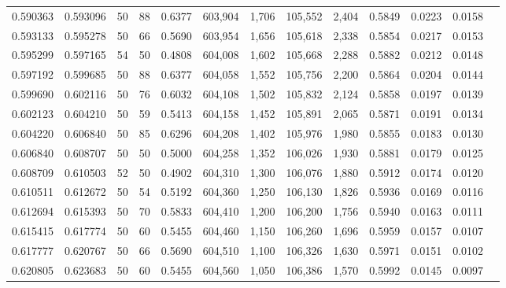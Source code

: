 \begin{tabular}{rrrrrrrrrrrrr}
0.590363 & 0.593096 &    50 &  88 &                                     0.6377 & 603,904 &   1,706 & 105,552 &   2,404 & 0.5849 & 0.0223 & 0.0158 \\
0.593133 & 0.595278 &    50 &  66 &                                     0.5690 & 603,954 &   1,656 & 105,618 &   2,338 & 0.5854 & 0.0217 & 0.0153 \\
0.595299 & 0.597165 &    54 &  50 &                                     0.4808 & 604,008 &   1,602 & 105,668 &   2,288 & 0.5882 & 0.0212 & 0.0148 \\
0.597192 & 0.599685 &    50 &  88 &                                     0.6377 & 604,058 &   1,552 & 105,756 &   2,200 & 0.5864 & 0.0204 & 0.0144 \\
0.599690 & 0.602116 &    50 &  76 &                                     0.6032 & 604,108 &   1,502 & 105,832 &   2,124 & 0.5858 & 0.0197 & 0.0139 \\
0.602123 & 0.604210 &    50 &  59 &                                     0.5413 & 604,158 &   1,452 & 105,891 &   2,065 & 0.5871 & 0.0191 & 0.0134 \\
0.604220 & 0.606840 &    50 &  85 &                                     0.6296 & 604,208 &   1,402 & 105,976 &   1,980 & 0.5855 & 0.0183 & 0.0130 \\
0.606840 & 0.608707 &    50 &  50 &                                     0.5000 & 604,258 &   1,352 & 106,026 &   1,930 & 0.5881 & 0.0179 & 0.0125 \\
0.608709 & 0.610503 &    52 &  50 &                                     0.4902 & 604,310 &   1,300 & 106,076 &   1,880 & 0.5912 & 0.0174 & 0.0120 \\
0.610511 & 0.612672 &    50 &  54 &                                     0.5192 & 604,360 &   1,250 & 106,130 &   1,826 & 0.5936 & 0.0169 & 0.0116 \\
0.612694 & 0.615393 &    50 &  70 &                                     0.5833 & 604,410 &   1,200 & 106,200 &   1,756 & 0.5940 & 0.0163 & 0.0111 \\
0.615415 & 0.617774 &    50 &  60 &                                     0.5455 & 604,460 &   1,150 & 106,260 &   1,696 & 0.5959 & 0.0157 & 0.0107 \\
0.617777 & 0.620767 &    50 &  66 &                                     0.5690 & 604,510 &   1,100 & 106,326 &   1,630 & 0.5971 & 0.0151 & 0.0102 \\
0.620805 & 0.623683 &    50 &  60 &                                     0.5455 & 604,560 &   1,050 & 106,386 &   1,570 & 0.5992 & 0.0145 & 0.0097 \\

\end{tabular}
